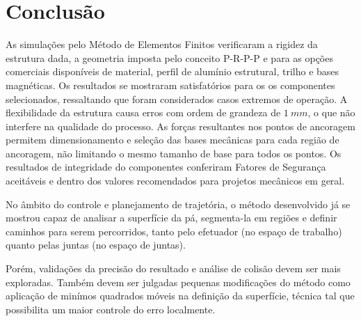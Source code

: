 \section{Conclusão}

As simulações pelo Método de Elementos Finitos verificaram a rigidez da
estrutura dada, a geometria imposta pelo conceito P-R-P-P e para as opções
comerciais disponíveis de material, perfil de alumínio estrutural, trilho e bases
magnéticas.
Os resultados se mostraram satisfatórios para os os componentes selecionados,
ressaltando que foram considerados casos extremos de operação. A flexibilidade
da estrutura causa erros com ordem de grandeza de $1~mm$, o que não interfere na
qualidade do processo.
As forças resultantes nos pontos de ancoragem permitem dimensionamento e seleção
das bases mecânicas para cada região de ancoragem, não limitando o mesmo tamanho
de base para todos os pontos.
Os resultados de integridade do componentes conferiram Fatores de Segurança
aceitáveis e dentro dos valores recomendados para projetos mecânicos em geral.


No âmbito do controle e planejamento de trajetória, o método desenvolvido já se
mostrou capaz de analisar a superfície da pá, segmenta-la em regiões e definir
caminhos para serem percorridos, tanto pelo efetuador (no espaço de trabalho)
quanto pelas juntas (no espaço de juntas).

Porém, validações da precisão do resultado e análise de colisão devem ser mais
exploradas. Também devem ser julgadas pequenas modificações do método como
aplicação de minímos quadrados móveis na definição da superfície, técnica tal
que possibilita um maior controle do erro localmente.

